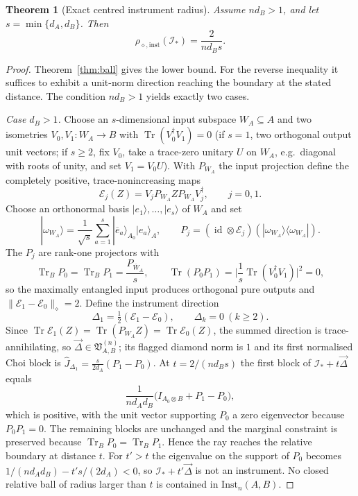 \documentclass[11pt,a4paper]{article}
\newtheorem{theorem}{Theorem}[section]
\newcommand{\Inst}{\mathrm{Inst}}
\newcommand{\Tr}{\operatorname{Tr}}
\newcommand{\id}{\operatorname{id}}
\newcommand{\Jhat}{\widehat J}
\newcommand{\vD}{\vec{\Delta}}
\begin{document}
\begin{theorem}[Exact centred instrument radius]
\label{thm:exact-radius}
Assume $nd_B>1$, and let $s=\min\{d_A,d_B\}$. Then
\[
\rho_{\diamond,\mathrm{inst}}(\mathcal I_*)=\frac{2}{nd_Bs}.
\]
\end{theorem}

\begin{proof}
Theorem~\ref{thm:ball} gives the lower bound. For the reverse inequality it suffices to exhibit a unit-norm direction reaching the boundary at the stated distance. The condition $nd_B>1$ yields exactly two cases.

\emph{Case $d_B>1$.} Choose an $s$-dimensional input subspace $W_A\subseteq A$ and two isometries $V_0,V_1:W_A\to B$ with $\Tr(V_0^\dagger V_1)=0$ (if $s=1$, two orthogonal output unit vectors; if $s\ge2$, fix $V_0$, take a trace-zero unitary $U$ on $W_A$, e.g.\ diagonal with roots of unity, and set $V_1=V_0U$). With $P_{W_A}$ the input projection define the completely positive, trace-nonincreasing maps
\[
\mathcal E_j(Z)=V_jP_{W_A}ZP_{W_A}V_j^\dagger,\qquad j=0,1.
\]
Choose an orthonormal basis $|e_1\rangle,\dots,|e_s\rangle$ of $W_A$ and set
\[
|\omega_{W_A}\rangle=\frac1{\sqrt s}\sum_{a=1}^s|\overline e_a\rangle_{A_0}|e_a\rangle_A,
\qquad
P_j=(\id\otimes\mathcal E_j)(|\omega_{W_A}\rangle\langle\omega_{W_A}|).
\]
The $P_j$ are rank-one projectors with
\[
\Tr_BP_0=\Tr_BP_1=\frac{P_{\overline W_A}}s,
\qquad
\Tr(P_0P_1)=\Big|\frac1s\Tr(V_0^\dagger V_1)\Big|^2=0,
\]
so the maximally entangled input produces orthogonal pure outputs and $\|\mathcal E_1-\mathcal E_0\|_\diamond=2$. Define the instrument direction
\[
\Delta_1=\tfrac12(\mathcal E_1-\mathcal E_0),\qquad \Delta_k=0\ (k\ge2).
\]
Since $\Tr\mathcal E_1(Z)=\Tr(P_{W_A}Z)=\Tr\mathcal E_0(Z)$, the summed direction is trace-annihilating, so $\vD\in\mathfrak V_{A,B}^{(n)}$; its flagged diamond norm is $1$ and its first normalised Choi block is $\Jhat_{\Delta_1}=\tfrac{s}{2d_A}(P_1-P_0)$. At $t=2/(nd_Bs)$ the first block of $\mathcal I_*+t\vD$ equals
\[
\frac1{nd_Ad_B}\big(I_{A_0\otimes B}+P_1-P_0\big),
\]
which is positive, with the unit vector supporting $P_0$ a zero eigenvector because $P_0P_1=0$. The remaining blocks are unchanged and the marginal constraint is preserved because $\Tr_BP_0=\Tr_BP_1$. Hence the ray reaches the relative boundary at distance $t$. For $t'>t$ the eigenvalue on the support of $P_0$ becomes $1/(nd_Ad_B)-t's/(2d_A)<0$, so $\mathcal I_*+t'\vD$ is not an instrument. No closed relative ball of radius larger than $t$ is contained in $\Inst_n(A,B)$.


\end{proof}
\end{document}
